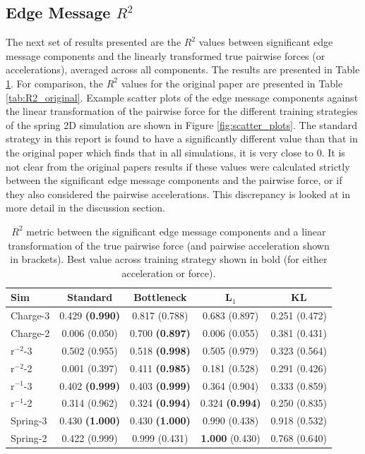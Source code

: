 \documentclass[11pt]{article}
\begin{document}
\subsection{Edge Message $R^2$}
The next set of results presented are the $R^2$ values between significant edge message components and the linearly transformed true pairwise forces (or accelerations), averaged across all components. The results are presented in Table \ref{tab:R2}. For comparison, the $R^2$ values for the original paper are presented in Table \ref{tab:R2_original}. Example scatter plots of the edge message components against the linear transformation of the pairwise force for the different training strategies of the spring 2D simulation are shown in Figure \ref{fig:scatter_plots}. The standard strategy in this report is found to have a significantly different value than that in the original paper which finds that in all simulations, it is very close to 0. It is not clear from the original papers results if these values were calculated strictly between the significant edge message components and the pairwise force, or if they also considered the pairwise accelerations. This discrepancy is looked at in more detail in the discussion section.
    \begin{table}[H]
        \centering
        \begin{tabular}{lcccc}
        \hline
        Sim & Standard & Bottleneck & L$_1$ & KL \\
        \hline
        Charge-3 & 0.429 \textbf{(0.990)} & 0.817 (0.788) & 0.683 (0.897) & 0.251 (0.472) \\
        Charge-2 & 0.006 (0.050) & 0.700 \textbf{(0.897)} & 0.006 (0.055) & 0.381 (0.431)\\
        r$^{-2}$-3 & 0.502 (0.955) & 0.518 \textbf{(0.998)} & 0.505 (0.979) & 0.323 (0.564) \\
        r$^{-2}$-2 & 0.001 (0.397) & 0.411 \textbf{(0.985)} & 0.181 (0.528) & 0.291 (0.426) \\
        r$^{-1}$-3 & 0.402 \textbf{(0.999)} & 0.403 \textbf{(0.999)} & 0.364 (0.904) & 0.333 (0.859)\\
        r$^{-1}$-2 & 0.314 (0.962) & 0.324 \textbf{(0.994)} & 0.324 \textbf{(0.994)} & 0.250 (0.835) \\
        Spring-3 & 0.430 \textbf{(1.000)}& 0.430 \textbf{(1.000)} & 0.990 (0.438) & 0.918 (0.532)\\
        Spring-2 & 0.422 (0.999) & 0.999 (0.431) & \textbf{1.000} (0.430) & 0.768 (0.640) \\

        \hline
        \end{tabular}
        \caption{$R^2$ metric between the significant edge message components and a linear transformation of the true pairwise force (and pairwise acceleration shown in brackets). Best value across training strategy shown in bold (for either acceleration or force).}
        \label{tab:R2}
    \end{table}
\end{document}
